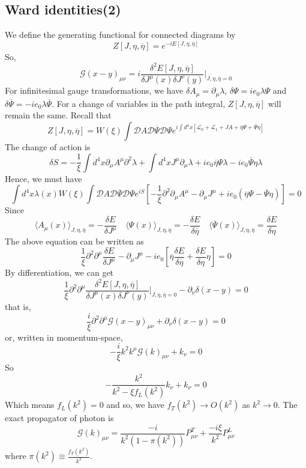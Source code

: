 \subsection{Ward identities(2)}
\noindent
We define the generating functional for connected diagrams by
\[Z[J,\eta,\overline{\eta}] = e^{-iE[J,\eta,\overline{\eta}]}\]
So,
\[\mathcal{G}(x-y)_{\mu\nu} = i  \frac{\delta^2 E[J,\eta,\overline{\eta}]}{\delta J^{\mu}(x) \delta J^{\nu}(y)}\bigg|_{J,\eta,\overline{\eta}=0}\]
For infinitesimal gauge transformations, we have $\delta A_{\mu} = \partial_{\mu} \lambda $, $\delta \Psi = ie_0\lambda\Psi$ and $\delta \overline{\Psi}  = -ie_0 \lambda \overline{\Psi}$. 
For a change of variables in the path integral, $Z[J,\eta,\overline{\eta}]$ will remain the same. 
Recall that
\[Z[J,\eta,\overline{\eta}] = W(\xi) \int \mathcal{D}A \mathcal{D}\overline{\Psi} \mathcal{D}\Psi e^{i\int d^4x [\mathcal{L}_0 + \mathcal{L}_1 + JA + \overline{\eta}\Psi + \overline{\Psi}\eta]} \]
The change of action is
\[\delta S = -\frac{1}{\xi} \int d^4x \partial_{\mu} A^{\mu} \partial^2 \lambda + \int d^4x J^{\mu}\partial_{\mu}\lambda + ie_0\overline{\eta}\Psi\lambda - ie_0\overline{\Psi}\eta\lambda\]
Hence, we must have
\[\int d^4x \lambda(x) W(\xi)\int \mathcal{D}A \mathcal{D}\overline{\Psi} \mathcal{D}\Psi e^{iS} \left[ -\frac{1}{\xi} \partial^2 \partial_{\mu} A^{\mu} - \partial_{\mu}J^{\mu}  + ie_0(\overline{\eta}\Psi - \overline{\Psi}\eta)\right] = 0 \]
Since
\[\langle A_{\mu}(x) \rangle_{J,\eta,\overline{\eta}} = - \frac{\delta E}{\delta J^{\mu}} \quad \langle \Psi(x) \rangle_{J,\eta,\overline{\eta}} = - \frac{\delta E}{\delta \overline{\eta}} \quad \langle \overline{\Psi}(x) \rangle_{J,\eta,\overline{\eta}} =  \frac{\delta E}{\delta \eta}\]
The above equation can be written as
\[\frac{1}{\xi} \partial^2 \partial^{\mu}\frac{\delta E}{\delta J^{\mu}} - \partial_{\mu}J^{\mu} - ie_0\left[ \overline{\eta}\frac{\delta E}{\delta \overline{\eta}} + \frac{\delta E}{\delta \eta} \eta \right]=0\]
By differentiation, we can get
\[\frac{1}{\xi} \partial^2 \partial^{\mu} \frac{\delta^2 E[J,\eta,\overline{\eta}]}{\delta J^{\mu}(x) \delta J^{\nu}(y)}\bigg|_{J,\eta,\overline{\eta}=0} - \partial_{\nu} \delta(x-y) = 0\]
that is,
\[\frac{i}{\xi}\partial^2 \partial^{\mu} \mathcal{G}(x-y)_{\mu\nu}+ \partial_{\nu} \delta(x-y) = 0 \]
or, written in momentum-space,
\[-\frac{i}{\xi}k^2 k^{\mu} \mathcal{G}(k)_{\mu\nu}+ k_{\nu} = 0\]
So
\[- \frac{k^2}{k^2-\xi f_L(k^2)} k_{\nu} + k_{\nu} = 0\]
Which means $f_L(k^2) =0$ and so, we have $f_T(k^2) \to O(k^2)$ as $k^2 \to 0$. The exact propagator of photon is
\[\mathcal{G}(k)_{\mu\nu} = \frac{-i}{k^2(1-\pi(k^2))}P^T_{\mu\nu} + \frac{-i\xi}{k^2} P^L_{\mu\nu}\]
where $\pi(k^2) \equiv \frac{f_T(k^2)}{k^2}$.


